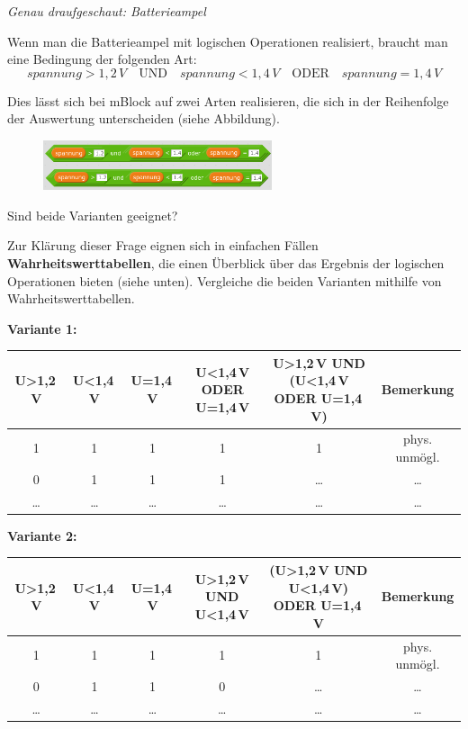 \begin{aufgabe} \emph{Genau draufgeschaut: Batterieampel}
	
	Wenn man die Batterieampel mit logischen Operationen realisiert, braucht man eine Bedingung der folgenden Art:
	\begin{equation*}
		spannung > 1,2\,V \quad \text{UND} \quad  spannung < 1,4\,V \quad  \text{ODER} \quad spannung = 1,4\,V
	\end{equation*}
	
	Dies lässt sich bei mBlock auf zwei Arten realisieren, die sich in der Reihenfolge der Auswertung unterscheiden (siehe Abbildung).
	
	\begin{figure}[H]
		\centering
		\includegraphics[width=0.6\textwidth]{./pics/batterieampel-log-operationen.png}
	\end{figure}

	Sind beide Varianten geeignet?
	
	Zur Klärung dieser Frage eignen sich in einfachen Fällen \textbf{Wahrheitswerttabellen}, die einen Überblick über das Ergebnis der logischen Operationen bieten (siehe unten). Vergleiche die beiden Varianten mithilfe von Wahrheitswerttabellen.
	
	\bigskip
	\textbf{Variante 1:}
	
	\medskip
	\begin{minipage}{\textwidth}
		\small
		\centering
		\begin{tabular}{c|c|c|c|c|c}
			U>1,2\,V & U<1,4\,V & U=1,4\,V & U<1,4\,V ODER U=1,4\,V & \parbox{4cm}{U>1,2\,V UND (U<1,4\,V ODER U=1,4\,V)} & Bemerkung\\  & 1 & 1 & 1 & 1 & phys. unmögl. \\
			0 & 1 & 1 & 1 & \dots & \dots\\
			\dots & \dots & \dots & \dots & \dots & \dots\\
		\end{tabular}
	\end{minipage}
	
	\bigskip
	\textbf{Variante 2:}
	
	\medskip
	\begin{minipage}{\textwidth}
		\small
		\centering
		\begin{tabular}{c|c|c|c|c|c}
			U>1,2\,V & U<1,4\,V & U=1,4\,V & U>1,2\,V UND U<1,4\,V & \parbox{4cm}{(U>1,2\,V UND U<1,4\,V) ODER U=1,4\,V} & Bemerkung\\  & 1 & 1 & 1 & 1 & phys. unmögl. \\
			0 & 1 & 1 & 0 & \dots & \dots \\
			\dots & \dots & \dots & \dots & \dots & \dots\\
		\end{tabular}
	\end{minipage}
\end{aufgabe}

